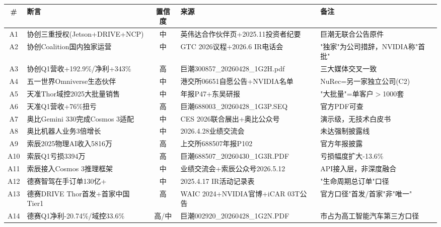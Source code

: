 \begin{longtable}{c L{3.2cm} c L{4cm} L{4.5cm}}
\toprule
\textbf{\#} & \textbf{断言} & \textbf{置信度} & \textbf{来源} & \textbf{备注} \\
\midrule
\endhead
\bottomrule
\endfoot

A1 & 协创三重授权(Jetson+DRIVE+NCP) & \textcolor{riskamber}{中} & 英伟达合作伙伴页+2025.11投资者纪要 & 巨潮无联合公告原件 \\
\midrule
A2 & 协创Coalition国内独家运营 & \textcolor{riskamber}{中} & GTC 2026议程+2026.6 IR电话会 & "独家"为公司措辞，NVIDIA称"首批" \\
\midrule
A3 & 协创Q1营收+192.9\%/净利+343\% & \textcolor{riskgreen}{高} & 巨潮300857\_20260428\_1G2H.pdf & 三大媒体交叉一致 \\
\midrule
A4 & 五一世界Omniverse生态伙伴 & \textcolor{riskamber}{中} & 港交所06651自愿公告+NVIDIA名单 & NuRec=另一家独立公司(C2) \\
\midrule
A5 & 天准Thor域控2025大批量销售 & \textcolor{riskamber}{中} & 年报P47+东吴研报 & "大批量"=单客户$>$1000套 \\
\midrule
A6 & 天准Q1营收+76\%扭亏 & \textcolor{riskgreen}{高} & 巨潮688003\_20260428\_1G3P.SEQ & 官方PDF可查 \\
\midrule
A7 & 奥比Gemini 330完成Cosmos 3适配 & \textcolor{riskamber}{中} & CES 2026联合展出+奥比公众号 & 演示级，无技术白皮书 \\
\midrule
A8 & 奥比机器人业务3倍增长 & \textcolor{riskamber}{中} & 2026.4.28业绩交流会 & 未达强制披露线 \\
\midrule
A9 & 索辰2025物理AI收入5816万 & \textcolor{riskgreen}{高} & 上交所688507年报P102 & 官方年报披露 \\
\midrule
A10 & 索辰Q1亏损3394万 & \textcolor{riskgreen}{高} & 巨潮688507\_20260430\_1G3R.PDF & 亏损幅度扩大-13.6\% \\
\midrule
A11 & 索辰接入Cosmos 3推理框架 & \textcolor{riskamber}{中} & 业绩交流会+索辰公众号2026.5.12 & API接入层，非深度融合 \\
\midrule
A12 & 德赛智驾在手订单130亿+ & \textcolor{riskamber}{中} & 2025.4.17 IR活动记录表 & "生命周期总订单"口径 \\
\midrule
A13 & 德赛DRIVE Thor首发+首家中国Tier1 & \textcolor{riskgreen}{高} & WAIC 2024+NVIDIA官博+iCAR 03T公告 & 官方口径"首发/首家"非"唯一" \\
\midrule
A14 & 德赛Q1净利-20.74\%/域控33.6\% & \textcolor{riskgreen}{高}/\textcolor{riskamber}{中} & 巨潮002920\_20260428\_1G2N.PDF & 市占为高工智能汽车第三方口径 \\

\end{longtable}
